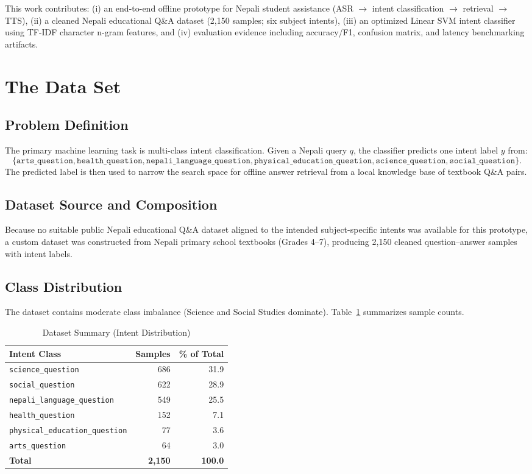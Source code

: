 \documentclass[conference]{IEEEtran}
\begin{document}
This work contributes: (i) an end-to-end offline prototype for Nepali student assistance (ASR $\rightarrow$ intent classification $\rightarrow$ retrieval $\rightarrow$ TTS), (ii) a cleaned Nepali educational Q\&A dataset (2{,}150 samples; six subject intents), (iii) an optimized Linear SVM intent classifier using TF-IDF character n-gram features, and (iv) evaluation evidence including accuracy/F1, confusion matrix, and latency benchmarking artifacts.

\section{The Data Set}
\subsection{Problem Definition}
The primary machine learning task is multi-class intent classification. Given a Nepali query $q$, the classifier predicts one intent label $y$ from:
\[
\{\texttt{arts\_question},\texttt{health\_question},\texttt{nepali\_language\_question},\texttt{physical\_education\_question},\texttt{science\_question},\texttt{social\_question}\}.
\]
The predicted label is then used to narrow the search space for offline answer retrieval from a local knowledge base of textbook Q\&A pairs.

\subsection{Dataset Source and Composition}
Because no suitable public Nepali educational Q\&A dataset aligned to the intended subject-specific intents was available for this prototype, a custom dataset was constructed from Nepali primary school textbooks (Grades 4--7), producing 2{,}150 cleaned question--answer samples with intent labels.

\subsection{Class Distribution}
The dataset contains moderate class imbalance (Science and Social Studies dominate). Table~\ref{tab:intentdist} summarizes sample counts.

\begin{table}[ht]
\caption{Dataset Summary (Intent Distribution)}
\label{tab:intentdist}
\centering
\begin{tabular}{lrr}
\toprule
Intent Class & Samples & \% of Total \\
\midrule
\texttt{science\_question} & 686 & 31.9 \\
\texttt{social\_question} & 622 & 28.9 \\
\texttt{nepali\_language\_question} & 549 & 25.5 \\
\texttt{health\_question} & 152 & 7.1 \\
\texttt{physical\_education\_question} & 77 & 3.6 \\
\texttt{arts\_question} & 64 & 3.0 \\
\midrule
\textbf{Total} & \textbf{2{,}150} & \textbf{100.0} \\
\bottomrule
\end{tabular}
\end{table}
\end{document}
